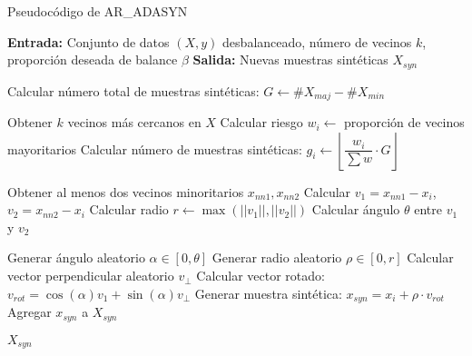 \begin{algorithm}[H]
\caption{Pseudocódigo de AR\_ADASYN}
\begin{algorithmic}[1]
\State \textbf{Entrada:} Conjunto de datos $(X, y)$ desbalanceado, número de vecinos $k$, proporción deseada de balance $\beta$
\State \textbf{Salida:} Nuevas muestras sintéticas $X_{syn}$

\State Calcular número total de muestras sintéticas: $G \gets \#X_{maj} - \#X_{min}$

    \State Obtener $k$ vecinos más cercanos en $X$
    \State Calcular riesgo $w_i \gets$ proporción de vecinos mayoritarios
    \State Calcular número de muestras sintéticas: $g_i \gets \left\lfloor \dfrac{w_i}{\sum w} \cdot G \right\rfloor$
\EndFor

    \State Obtener al menos dos vecinos minoritarios $x_{nn1}, x_{nn2}$
    \State Calcular $v_1 = x_{nn1} - x_i$, $v_2 = x_{nn2} - x_i$
    \State Calcular radio $r \gets \max(||v_1||, ||v_2||)$
    \State Calcular ángulo $\theta$ entre $v_1$ y $v_2$
    
        \State Generar ángulo aleatorio $\alpha \in [0, \theta]$
        \State Generar radio aleatorio $\rho \in [0, r]$
        \State Calcular vector perpendicular aleatorio $v_\perp$
        \State Calcular vector rotado: $v_{rot} = \cos(\alpha)v_1 + \sin(\alpha)v_\perp$
        \State Generar muestra sintética: $x_{syn} = x_i + \rho \cdot v_{rot}$
        \State Agregar $x_{syn}$ a $X_{syn}$
    \EndFor
\EndFor

\State \Return $X_{syn}$
\end{algorithmic}
\end{algorithm}
